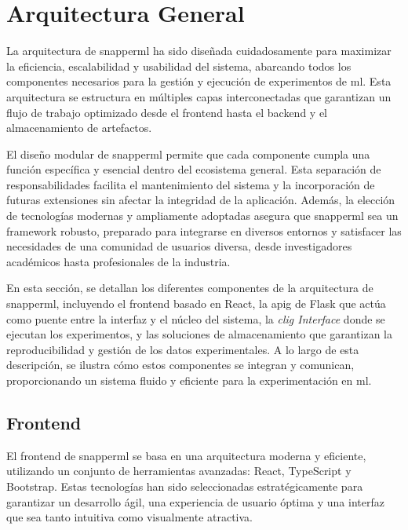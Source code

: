 \section{Arquitectura General}

La arquitectura de \Gls{snapperml} ha sido diseñada cuidadosamente para maximizar la eficiencia, escalabilidad y usabilidad del sistema, abarcando todos los componentes necesarios para la gestión y ejecución de experimentos de \acrshort{ml}. Esta arquitectura se estructura en múltiples capas interconectadas que garantizan un flujo de trabajo optimizado desde el \gls{frontend} hasta el \gls{backend} y el almacenamiento de \gls{artefactos}.

El diseño modular de \Gls{snapperml} permite que cada componente cumpla una función específica y esencial dentro del ecosistema general. Esta separación de responsabilidades facilita el mantenimiento del sistema y la incorporación de futuras extensiones sin afectar la integridad de la aplicación. Además, la elección de tecnologías modernas y ampliamente adoptadas asegura que \Gls{snapperml} sea un \gls{framework} robusto, preparado para integrarse en diversos entornos y satisfacer las necesidades de una comunidad de usuarios diversa, desde investigadores académicos hasta profesionales de la industria.

En esta sección, se detallan los diferentes componentes de la arquitectura de \Gls{snapperml}, incluyendo el \gls{frontend} basado en React, la \Gls{apig} de Flask que actúa como puente entre la interfaz y el núcleo del sistema, la \textit{\Gls{clig} Interface} donde se ejecutan los experimentos, y las soluciones de almacenamiento que garantizan la reproducibilidad y gestión de los datos experimentales. A lo largo de esta descripción, se ilustra cómo estos componentes se integran y comunican, proporcionando un sistema fluido y eficiente para la experimentación en \acrshort{ml}.

\subsection{Frontend}

El \gls{frontend} de \Gls{snapperml} se basa en una arquitectura moderna y eficiente, utilizando un conjunto de herramientas avanzadas: React, TypeScript y Bootstrap. Estas tecnologías han sido seleccionadas estratégicamente para garantizar un desarrollo ágil, una experiencia de usuario óptima y una interfaz que sea tanto intuitiva como visualmente atractiva.

